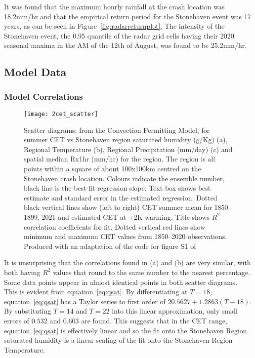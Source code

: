 It was found that the maximum hourly rainfall at the crash location was 18.2mm/hr and
    that the empirical return period for the Stonehaven event was 17 years,
    as can be seen in Figure~\ref{fig:radarreturnplot}.
The intensity of the Stonehaven event,
    the 0.95 quantile of the radar grid cells having their 2020 seasonal maxima in the AM of the 12th of August,
    was found to be 25.2mm/hr.


\subsection{Model Data}\label{subsec:modelcorr}

\subsubsection{Model Correlations}

\begin{figure}[H]
    \centering
    \texttt{[image: 2cet\_scatter]}
    \caption[Scatter diagrams from the Convection Permitting Model.]{
        Scatter diagrams, from the Convection Permitting Model,
        for summer CET vs Stonehaven region saturated humidity (g/Kg) (a),
        Regional Temperature (b),
        Regional  Precipitation (mm/day) (c) and
        spatial median Rx1hr (mm/hr) for the region.
    The region is all points within a square of about 100x100km centred on the Stonehaven crash location.
    Colours indicate the ensemble number, black line is the best-fit regression slope.
    Text box shows best estimate and standard error in the estimated regression.
    Dotted black vertical lines show (left to right) CET summer mean for 1850--1899, 2021 and estimated CET at +2K warming.
    Title shows $R^2$ correlation coefficients for fit.
    Dotted vertical red lines show minimum and maximum CET values from 1850--2020 observations.
    Produced with an adaptation of the code for figure S1 of~\cite{Tett_Soon}}
    \label{fig:2cet_scatter}
\end{figure}

It is unsurprising that the correlations found in (a) and (b) are very similar,
    with both having $R^2$ values that round to the same number to the nearest percentage.
Some data points appear in almost identical points in both scatter diagrams.
This is evident from equation~\ref{eq:qsat}.
By differentiating at $T=18$,
    equation~\ref{eq:qsat} has a Taylor series to first order of $20.5627+1.2863(T-18)$.
By substituting $T=14$ and $T=22$ into this linear approximation,
    only small errors of $0.532$ and $0.603$ are found.
This suggests that in the CET range, equation~\ref{eq:qsat} is effectively linear and so the fit onto the Stonehaven Region saturated humidity
    is a linear scaling of the fit onto the Stonehaven Region Temperature.

